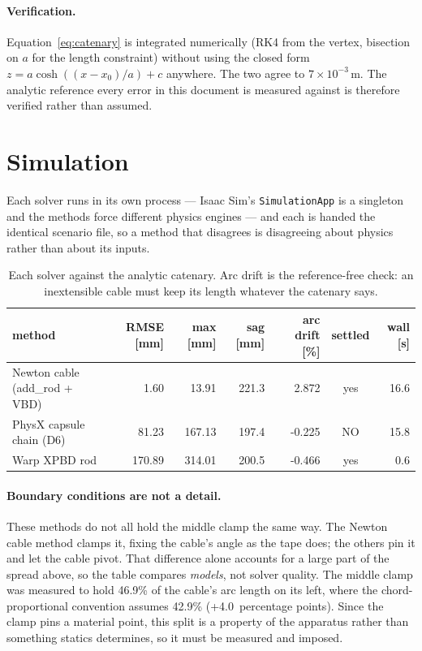 \documentclass[11pt,a4paper]{article}
\begin{document}
\paragraph{Verification.} Equation~\eqref{eq:catenary} is integrated
numerically (RK4 from the vertex, bisection on $a$ for the length constraint)
without using the closed form $z = a\cosh((x-x_0)/a) + c$ anywhere. The two
agree to $7\times10^{-3}$\,\textmu m. The analytic reference every error in
this document is measured against is therefore verified rather than assumed.

\section{Simulation}

Each solver runs in its own process --- Isaac Sim's \texttt{SimulationApp} is
a singleton and the methods force different physics engines --- and each is
handed the identical scenario file, so a method that disagrees is disagreeing
about physics rather than about its inputs.

\begin{table}[htbp]
\centering\small
\begin{tabular}{lrrrrcr}
\toprule
method & RMSE [mm] & max [mm] & sag [mm] & arc drift [\%] & settled & wall [s] \\
\midrule
    Newton cable (add\_rod + VBD) & 1.60 & 13.91 & 221.3 & 2.872 & yes & 16.6 \\
    PhysX capsule chain (D6) & 81.23 & 167.13 & 197.4 & -0.225 & NO & 15.8 \\
    Warp XPBD rod & 170.89 & 314.01 & 200.5 & -0.466 & yes & 0.6 \\
\bottomrule
\end{tabular}
\caption{Each solver against the analytic catenary. Arc drift is the
reference-free check: an inextensible cable must keep its length whatever the
catenary says.}
\end{table}

\paragraph{Boundary conditions are not a detail.} These methods do not all
hold the middle clamp the same way. The Newton cable method clamps it, fixing
the cable's angle as the tape does; the others pin it and let the cable pivot.
That difference alone accounts for a large part of the spread above, so the
table compares \emph{models}, not solver quality. The middle clamp was measured to hold 46.9\% of the cable's arc length on its left, where the chord-proportional convention assumes 42.9\% (+4.0~percentage points). Since the clamp pins a material point, this split is a property of the apparatus rather than something statics determines, so it must be measured and imposed.
\end{document}
